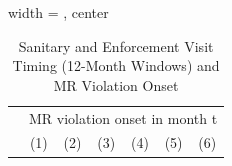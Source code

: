 
\begin{table}[htbp]
   
   \caption{\label{tab:sanitary_visit_mr_violation_iterative_12mo_test} Sanitary and Enforcement Visit Timing (12-Month Windows) and MR Violation Onset}
   \bigskip
   
   \centering
   
   \begin{adjustbox}{width = \textwidth, center}
      
      
      \begin{tabular}{lcccccc}
         \toprule
         
          & \multicolumn{6}{c}{MR violation onset in month t}\\
         
                                                & (1)            & (2)           & (3)           & (4)            & (5)            & (6)\\  
         

\end{tabular}
\end{adjustbox}
\end{table}
